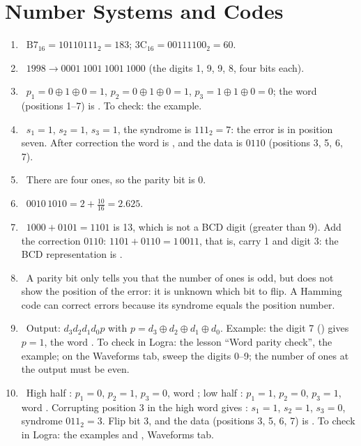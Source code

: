 \section*{Number Systems and Codes}
\begin{enumerate}
  \item {}~$\text{B7}_{16}=10110111_2=183$; $\text{3C}_{16}=00111100_2=60$.
  \item {}~$1998 \to 0001\ 1001\ 1001\ 1000$ (the digits 1, 9, 9, 8, four bits each).
  \item {}~$p_1=0\oplus1\oplus0=1$, $p_2=0\oplus1\oplus0=1$, $p_3=1\oplus1\oplus0=0$; the word (positions 1--7) is . To check: the  example.
  \item {}~$s_1=1$, $s_2=1$, $s_3=1$, the syndrome is $111_2=7$: the error is in position seven. After correction the word is , and the data is $0110$ (positions 3, 5, 6, 7).
  \item {}~There are four ones, so the parity bit is 0.
  \item {}~$0010\,1010 = 2 + \tfrac{10}{16} = 2.625$.
  \item {}~$1000+0101=1101$ is 13, which is not a BCD digit (greater than 9). Add the correction $0110$: $1101+0110=1\,0011$, that is, carry 1 and digit 3: the BCD representation is .
  \item {}~A parity bit only tells you that the number of ones is odd, but does not show the position of the error: it is unknown which bit to flip. A Hamming code can correct errors because its syndrome equals the position number.
  \item {}~Output: $d_3d_2d_1d_0p$ with $p=d_3\oplus d_2\oplus d_1\oplus d_0$. Example: the digit 7 () gives $p=1$, the word . To check in Logra: the lesson ``Word parity check'', the  example; on the Waveforms tab, sweep the digits 0--9; the number of ones at the output must be even.
  \item {}~High half : $p_1=0$, $p_2=1$, $p_3=0$, word ; low half : $p_1=1$, $p_2=0$, $p_3=1$, word . Corrupting position 3 in the high word gives : $s_1=1$, $s_2=1$, $s_3=0$, syndrome $011_2=3$. Flip bit 3, and the data (positions 3, 5, 6, 7) is . To check in Logra: the examples  and , Waveforms tab.
\end{enumerate}

